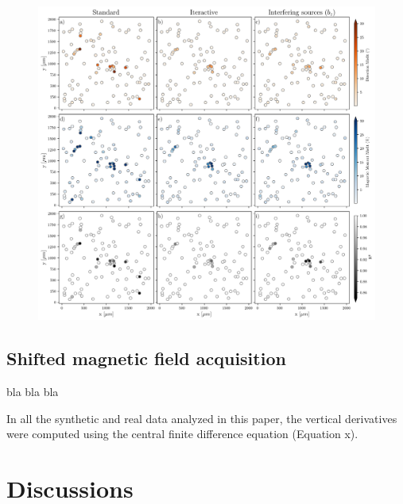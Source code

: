 \begin{figure}[tb!]
  \centering
  \includegraphics[width=1\linewidth]{figures/inversion-comparion-1.png}
  \caption{
      }
  \label{inversion1}
\end{figure}




\subsection{Shifted magnetic field acquisition}

bla bla bla

In all the synthetic and real data analyzed in this paper, the vertical derivatives were computed using the central finite difference equation (Equation x).

\section{Discussions}


